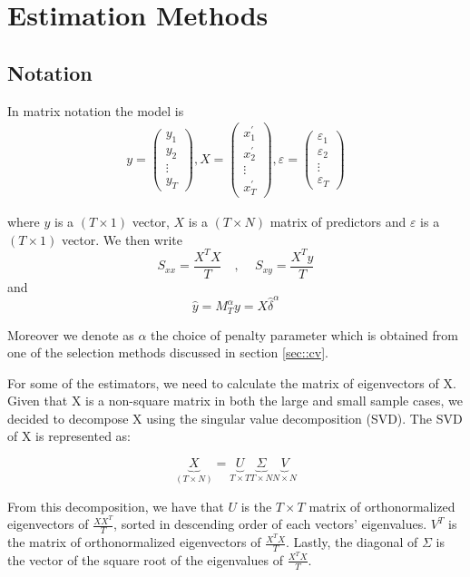 \section{Estimation Methods}

\subsection{Notation}

In matrix notation the model is 
\begin{align*}
y=\left(\begin{array}{c}
y_{1} \\
y_{2} \\
\vdots \\
y_{T}
\end{array}\right), X=\left(\begin{array}{c}
x_{1}^{\prime} \\
x_{2}^{\prime} \\
\vdots \\
x_{T}^{\prime}
\end{array}\right), \varepsilon=\left(\begin{array}{c}
\varepsilon_{1} \\
\varepsilon_{2} \\
\vdots \\
\varepsilon_{T}
\end{array}\right)
\end{align*}


where $y$ is a $(T \times 1)$ vector, $X$ is a $(T \times N)$ matrix of predictors and $\varepsilon$ is a $(T \times 1)$ vector. We then write 
\[S_{xx} = \frac{X^{T} X}{T} \quad \text{, } \quad S_{xy} = \frac{X^{T} y}{T} \]
and 
\[\widehat{y} = M_{T}^{\alpha} y = X \widehat{\delta}^{\alpha}\]

Moreover we denote as $\alpha$ the choice of penalty parameter which is obtained from one of the selection methods discussed in section \ref{sec::cv}.

For some of the estimators, we need to calculate the matrix of eigenvectors of X. Given that X is a non-square matrix in both the large and small sample cases, we decided to decompose X using the singular value decomposition (SVD). The SVD of X is represented as:

\[\underbrace{X}_{(T \times N)} = \underbrace{U}_{T \times T} \underbrace{\Sigma}_{T \times N} \underbrace{V}_{N \times N}\]

From this decomposition, we have that $U$ is the $T \times T$ matrix of orthonormalized eigenvectors of $\frac{X X^{T}}{T}$, sorted in descending order of each vectors' eigenvalues. $V^{T}$ is the matrix of orthonormalized eigenvectors of $\frac{X^{T} X}{T}$. Lastly, the diagonal of $\Sigma$ is the vector of the square root of the eigenvalues of $\frac{X^{T} X}{T}$.


